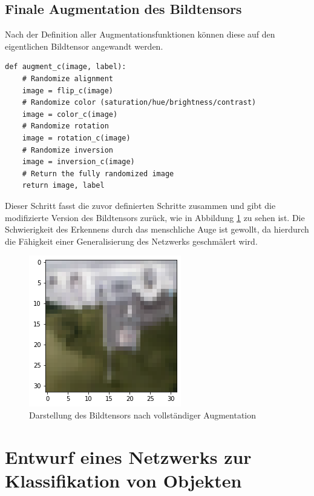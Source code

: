 \subsection{Finale Augmentation des Bildtensors}

Nach der Definition aller Augmentationsfunktionen können diese auf den eigentlichen Bildtensor angewandt werden. 
\vspace*{10mm}
\begin{lstlisting}[caption={Finaler Augmentationsschritt}]
	def augment_c(image, label):
  	# Randomize alignment
  	image = flip_c(image)
  	# Randomize color (saturation/hue/brightness/contrast)
  	image = color_c(image)
  	# Randomize rotation
  	image = rotation_c(image)
  	# Randomize inversion
  	image = inversion_c(image)
  	# Return the fully randomized image
  	return image, label
\end{lstlisting}

Dieser Schritt fasst die zuvor definierten Schritte zusammen und gibt die modifizierte Version des Bildtensors zurück, wie in Abbildung \ref{fig:augmented} zu sehen ist. Die Schwierigkeit des Erkennens durch das menschliche Auge ist gewollt, da hierdurch die Fähigkeit einer Generalisierung des Netzwerks geschmälert wird. 

\begin{figure}[htb]
	\centering
	\includegraphics{images/augmented.png}
	\caption{Darstellung des Bildtensors nach vollständiger Augmentation}
	\label{fig:augmented}
\end{figure}

\section{Entwurf eines Netzwerks zur Klassifikation von Objekten}

